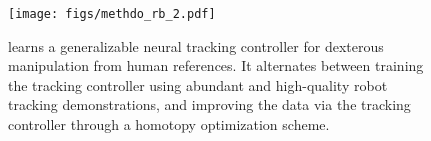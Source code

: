 \begin{figure}[h]
  \centering
  \texttt{[image: figs/methdo\_rb\_2.pdf]}
  \caption{\footnotesize
  \href{https://projectwebsite7.github.io/gene-dex-manip/}{\modelname}learns a generalizable neural tracking controller for dexterous manipulation from human references. It alternates between training the tracking controller using abundant and high-quality robot tracking demonstrations, and improving the data
  via the tracking controller through a homotopy optimization scheme.
  }
  \label{fig_method_detailed_pipeline}
\end{figure}



